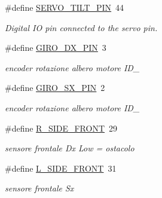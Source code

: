 \begin{DoxyCompactItemize}
\mbox{\label{ari_pi__2_d_c__esp__08_8ino_aacf6d5e66edfb457b13cbced950fc0af}} 
\#define \mbox{\hyperlink{ari_pi__2_d_c__esp__08_8ino_aacf6d5e66edfb457b13cbced950fc0af}{S\+E\+R\+V\+O\+\_\+\+T\+I\+L\+T\+\_\+\+P\+IN}}~44
\begin{DoxyCompactList}\small\item\em Digital IO pin connected to the servo pin. \end{DoxyCompactList}\item 
\mbox{\label{ari_pi__2_d_c__esp__08_8ino_a594090dbf515f41d4249fade4f14c463}} 
\#define \mbox{\hyperlink{ari_pi__2_d_c__esp__08_8ino_a594090dbf515f41d4249fade4f14c463}{G\+I\+R\+O\+\_\+\+D\+X\+\_\+\+P\+IN}}~3
\begin{DoxyCompactList}\small\item\em encoder rotazione albero motore I\+D\+\_ \end{DoxyCompactList}\item 
\mbox{\label{ari_pi__2_d_c__esp__08_8ino_ab1940449ba61cdf83d35a9dab25b039c}} 
\#define \mbox{\hyperlink{ari_pi__2_d_c__esp__08_8ino_ab1940449ba61cdf83d35a9dab25b039c}{G\+I\+R\+O\+\_\+\+S\+X\+\_\+\+P\+IN}}~2
\begin{DoxyCompactList}\small\item\em encoder rotazione albero motore I\+D\+\_ \end{DoxyCompactList}\item 
\mbox{\label{ari_pi__2_d_c__esp__08_8ino_a3b5d438b9c0508db7c53e86daa265dc8}} 
\#define \mbox{\hyperlink{ari_pi__2_d_c__esp__08_8ino_a3b5d438b9c0508db7c53e86daa265dc8}{R\+\_\+\+S\+I\+D\+E\+\_\+\+F\+R\+O\+NT}}~29
\begin{DoxyCompactList}\small\item\em sensore frontale Dx Low = ostacolo \end{DoxyCompactList}\item 
\mbox{\label{ari_pi__2_d_c__esp__08_8ino_a531e2edff1884d356024e8764761ffaa}} 
\#define \mbox{\hyperlink{ari_pi__2_d_c__esp__08_8ino_a531e2edff1884d356024e8764761ffaa}{L\+\_\+\+S\+I\+D\+E\+\_\+\+F\+R\+O\+NT}}~31
\begin{DoxyCompactList}\small\item\em sensore frontale Sx \end{DoxyCompactList}\item 

\end{DoxyCompactItemize}
